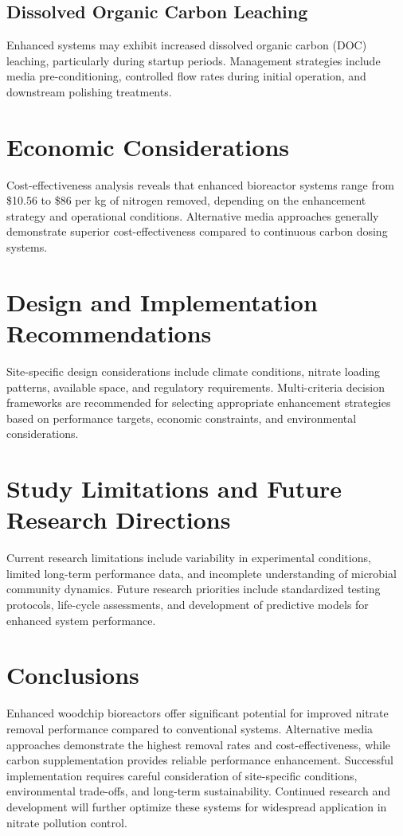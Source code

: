 \documentclass[12pt,a4paper]{article}
\begin{document}
\subsection{Dissolved Organic Carbon Leaching}

Enhanced systems may exhibit increased dissolved organic carbon (DOC) leaching, particularly during startup periods. Management strategies include media pre-conditioning, controlled flow rates during initial operation, and downstream polishing treatments.

\section{Economic Considerations}

Cost-effectiveness analysis reveals that enhanced bioreactor systems range from \$10.56 to \$86 per kg of nitrogen removed, depending on the enhancement strategy and operational conditions. Alternative media approaches generally demonstrate superior cost-effectiveness compared to continuous carbon dosing systems.

\section{Design and Implementation Recommendations}

Site-specific design considerations include climate conditions, nitrate loading patterns, available space, and regulatory requirements. Multi-criteria decision frameworks are recommended for selecting appropriate enhancement strategies based on performance targets, economic constraints, and environmental considerations.

\section{Study Limitations and Future Research Directions}

Current research limitations include variability in experimental conditions, limited long-term performance data, and incomplete understanding of microbial community dynamics. Future research priorities include standardized testing protocols, life-cycle assessments, and development of predictive models for enhanced system performance.

\section{Conclusions}

Enhanced woodchip bioreactors offer significant potential for improved nitrate removal performance compared to conventional systems. Alternative media approaches demonstrate the highest removal rates and cost-effectiveness, while carbon supplementation provides reliable performance enhancement. Successful implementation requires careful consideration of site-specific conditions, environmental trade-offs, and long-term sustainability. Continued research and development will further optimize these systems for widespread application in nitrate pollution control.



\end{document}
